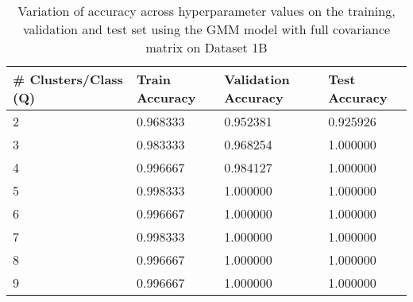 \begin{table}[H]
\centering
\begin{tabular}{l l l l}
\hline
\hline
\textbf{\# Clusters/Class (Q)} & \textbf{Train Accuracy} & \textbf{Validation Accuracy} & \textbf{Test Accuracy}\\
\hline
\hline
2 & 0.968333 & 0.952381 & 0.925926 \\
3 & 0.983333 & 0.968254 & 1.000000 \\
4 & 0.996667 & 0.984127 & 1.000000 \\
5 & 0.998333 & 1.000000 & 1.000000 \\
6 & 0.996667 & 1.000000 & 1.000000 \\
7 & 0.998333 & 1.000000 & 1.000000 \\
8 & 0.996667 & 1.000000 & 1.000000 \\
9 & 0.996667 & 1.000000 & 1.000000 \\
\hline
\end{tabular}
\caption{Variation of accuracy across hyperparameter values on the training, validation and test set using the GMM model with full covariance matrix on Dataset 1B}
\label{tab:1b_full}
\end{table}
